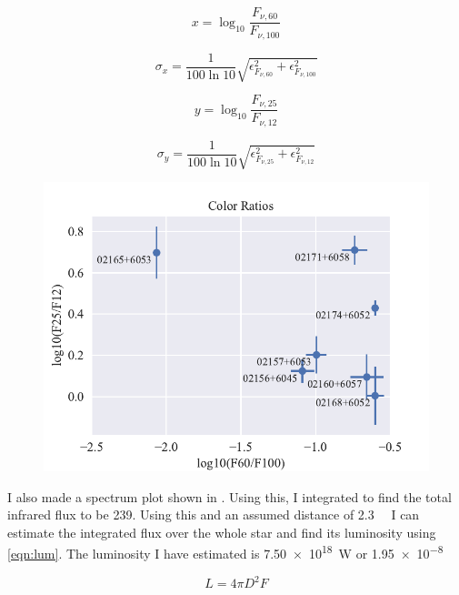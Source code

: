 \documentclass[]{article}
\begin{document}
\begin{equation}
x = \log_{10}{\frac{F_{\nu, 60}}{F_{\nu, 100}}}
\end{equation}

\begin{equation}
\sigma_x = \frac{1}{100 \ln{10}}\sqrt{\epsilon_{F_{\nu,60}}^2 + \epsilon_{F_{\nu,100}}^2}
\end{equation}

\begin{equation}
y = \log_{10}{\frac{F_{\nu, 25}}{F_{\nu, 12}}}
\end{equation}

\begin{equation}
\sigma_y = \frac{1}{100 \ln{10}}\sqrt{\epsilon_{F_{\nu,25}}^2 + \epsilon_{F_{\nu,12}}^2}
\end{equation}

\begin{figure}
	\centering
	\includegraphics[]{figs/colors.pdf}
\end{figure}

I also made a spectrum plot shown in . Using this, I integrated to find the total infrared flux to be \SI{239}{\jansky}. Using this and an assumed distance of \SI{2.3}{\kilo\pc} I can estimate the integrated flux over the whole star and find its luminosity using \autoref{eqn:lum}. The luminosity I have estimated is \SI{7.50e18}{\watt} or \SI{1.95e-8}{\solarlum}

\begin{equation}
L=4\pi D^2 F
\label{eqn:lum}
\end{equation}
\end{document}
